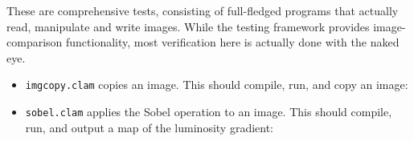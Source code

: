 These are comprehensive tests, consisting of full-fledged programs that actually
read, manipulate and write images. While the testing framework provides image-comparison functionality,
most verification here is actually done with the naked eye.\\

\begin{itemize}

\item\texttt{imgcopy.clam} copies an image. This should compile, run, and copy an image:


\item\texttt{sobel.clam} applies the Sobel operation to an image. This should compile, run, and output
a map of the luminosity gradient:


\end{itemize}



